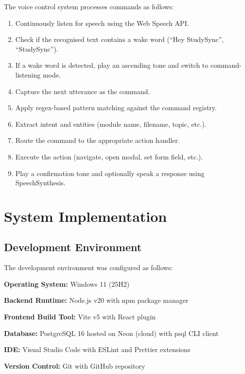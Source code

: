 \documentclass[12pt,a4paper]{report}
\begin{document}
The voice control system processes commands as follows:

\begin{enumerate}
    \item Continuously listen for speech using the Web Speech API.
    \item Check if the recognised text contains a wake word (``Hey StudySync'', ``StudySync'').
    \item If a wake word is detected, play an ascending tone and switch to command-listening mode.
    \item Capture the next utterance as the command.
    \item Apply regex-based pattern matching against the command registry.
    \item Extract intent and entities (module name, filename, topic, etc.).
    \item Route the command to the appropriate action handler.
    \item Execute the action (navigate, open modal, set form field, etc.).
    \item Play a confirmation tone and optionally speak a response using SpeechSynthesis.
\end{enumerate}

\chapter{System Implementation}

\section{Development Environment}

The development environment was configured as follows:

\textbf{Operating System:} Windows 11 (25H2)

\textbf{Backend Runtime:} Node.js v20 with npm package manager

\textbf{Frontend Build Tool:} Vite v5 with React plugin

\textbf{Database:} PostgreSQL 16 hosted on Neon (cloud) with psql CLI client

\textbf{IDE:} Visual Studio Code with ESLint and Prettier extensions

\textbf{Version Control:} Git with GitHub repository
\end{document}

